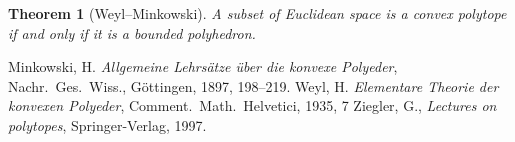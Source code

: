 \documentclass[12pt]{article}
\newtheorem*{theorem*}{Theorem}
\begin{document}
\begin{theorem*}[Weyl--Minkowski]
A subset of Euclidean space is a convex polytope if and only if it is a bounded polyhedron.
\end{theorem*}

\begin{thebibliography}{3}
Minkowski, H. \emph{Allgemeine Lehrs\"atze \"uber die konvexe Polyeder}, Nachr.~Ges.~Wiss., G\"ottingen, 1897, 198--219.
Weyl, H. \emph{Elementare Theorie der konvexen Polyeder}, Comment.~Math.~Helvetici, 1935, 7
Ziegler, G., \emph{Lectures on polytopes}, Springer-Verlag, 1997.
\end{thebibliography}
\end{document}
